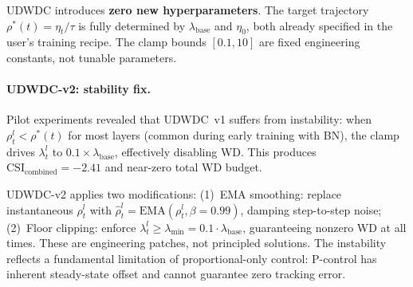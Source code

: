 \documentclass{article}
\begin{document}
UDWDC introduces \textbf{zero new hyperparameters}. The target trajectory $\rho^*(t) = \eta_t / \tau$ is fully determined by $\lambda_{\text{base}}$ and $\eta_0$, both already specified in the user's training recipe. The clamp bounds $[0.1, 10]$ are fixed engineering constants, not tunable parameters.

\paragraph{UDWDC-v2: stability fix.}
Pilot experiments revealed that UDWDC~v1 suffers from instability: when $\rho_t^l < \rho^*(t)$ for most layers (common during early training with BN), the clamp drives $\lambda_t^l$ to $0.1 \times \lambda_{\text{base}}$, effectively disabling WD. This produces $\text{CSI}_{\text{combined}} = -2.41$ and near-zero total WD budget.

UDWDC-v2 applies two modifications: (1)~EMA smoothing: replace instantaneous $\rho_t^l$ with $\hat{\rho}_t^l = \text{EMA}(\rho_t^l, \beta = 0.99)$, damping step-to-step noise; (2)~Floor clipping: enforce $\lambda_t^l \geq \lambda_{\min} = 0.1 \cdot \lambda_{\text{base}}$, guaranteeing nonzero WD at all times. These are engineering patches, not principled solutions. The instability reflects a fundamental limitation of proportional-only control: P-control has inherent steady-state offset and cannot guarantee zero tracking error.
\end{document}
